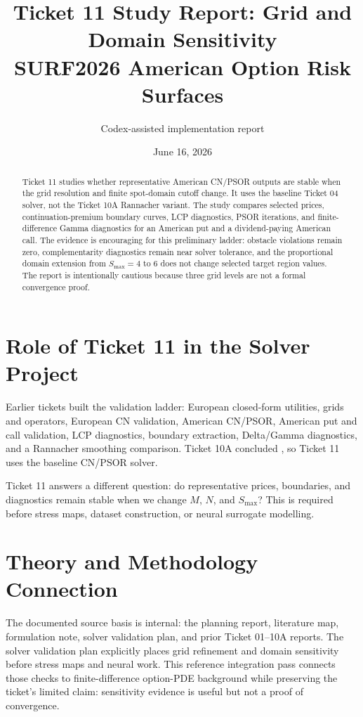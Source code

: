 \documentclass[11pt,a4paper]{article}
\title{\textbf{Ticket 11 Study Report: Grid and Domain Sensitivity}\\
\large SURF2026 American Option Risk Surfaces}
\author{Codex-assisted implementation report}
\date{June 16, 2026}
\begin{document}
\maketitle

\begin{abstract}
Ticket 11 studies whether representative American CN/PSOR outputs are stable when the grid
resolution and finite spot-domain cutoff change. It uses the baseline Ticket 04 solver, not the
Ticket 10A Rannacher variant. The study compares selected prices, continuation-premium boundary
curves, LCP diagnostics, PSOR iterations, and finite-difference Gamma diagnostics for an American
put and a dividend-paying American call. The evidence is encouraging for this preliminary ladder:
obstacle violations remain zero, complementarity diagnostics remain near solver tolerance, and
the proportional domain extension from \(S_{\max}=4\) to \(6\) does not change selected target
region values. The report is intentionally cautious because three grid levels are not a formal
convergence proof.
\end{abstract}

\tableofcontents
\newpage

\section{Role of Ticket 11 in the Solver Project}

Earlier tickets built the validation ladder: European closed-form utilities, grids and operators,
European CN validation, American CN/PSOR, American put and call validation, LCP diagnostics,
boundary extraction, Delta/Gamma diagnostics, and a Rannacher smoothing comparison. Ticket 10A
concluded , so Ticket 11 uses the baseline CN/PSOR solver.

Ticket 11 answers a different question: do representative prices, boundaries, and diagnostics
remain stable when we change \(M\), \(N\), and \(S_{\max}\)? This is required before stress maps,
dataset construction, or neural surrogate modelling.

\section{Theory and Methodology Connection}

The documented source basis is internal: the planning report, literature map, formulation note,
solver validation plan, and prior Ticket 01--10A reports. The solver validation plan explicitly
places grid refinement and domain sensitivity before stress maps and neural work. This reference
integration pass connects those checks to finite-difference option-PDE background
\citep{crank_nicolson_1947,wilmott_howison_dewynne_1995} while preserving the ticket's limited
claim: sensitivity evidence is useful but not a proof of convergence.
\end{document}
